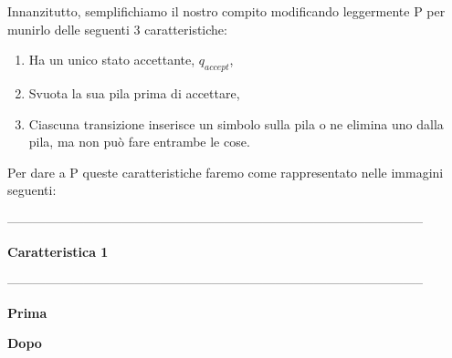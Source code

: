 \documentclass{article}
\begin{document}
Innanzitutto, semplifichiamo il nostro compito modificando leggermente P per munirlo delle seguenti 3 caratteristiche: 

\begin{enumerate}
    \item Ha un unico stato accettante, $q_{accept}$,
    \item Svuota la sua pila prima di accettare,
    \item Ciascuna transizione inserisce un simbolo sulla pila o ne elimina uno dalla pila, ma non può fare entrambe le cose.
\end{enumerate}

Per dare a P queste caratteristiche faremo come rappresentato nelle immagini seguenti:

\begin{center}

--------------------------------------------------------------------------------------------------

    \textbf{Caratteristica 1}

--------------------------------------------------------------------------------------------------

    \textbf{Prima}


    \textbf{Dopo}



\end{center}
\end{document}
